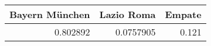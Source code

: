 \begin{tabular}{rrr}
\hline
   Bayern München &   Lazio Roma &   Empate \\
\hline
         0.802892 &    0.0757905 &    0.121 \\
\hline
\end{tabular}